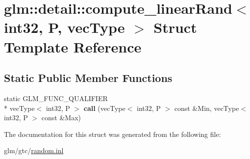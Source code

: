\hypertarget{structglm_1_1detail_1_1compute__linearRand_3_01int32_00_01P_00_01vecType_01_4}{\section{glm\-:\-:detail\-:\-:compute\-\_\-linear\-Rand$<$ int32, P, vec\-Type $>$ Struct Template Reference}
\label{structglm_1_1detail_1_1compute__linearRand_3_01int32_00_01P_00_01vecType_01_4}
}
\subsection*{Static Public Member Functions}
\begin{DoxyCompactItemize}
\item 
\hypertarget{structglm_1_1detail_1_1compute__linearRand_3_01int32_00_01P_00_01vecType_01_4_ac09eec8e177afcecc1e0d52d6d9951b3}{static G\-L\-M\-\_\-\-F\-U\-N\-C\-\_\-\-Q\-U\-A\-L\-I\-F\-I\-E\-R \\*
vec\-Type$<$ int32, P $>$ {\bfseries call} (vec\-Type$<$ int32, P $>$ const \&Min, vec\-Type$<$ int32, P $>$ const \&Max)}\label{structglm_1_1detail_1_1compute__linearRand_3_01int32_00_01P_00_01vecType_01_4_ac09eec8e177afcecc1e0d52d6d9951b3}

\end{DoxyCompactItemize}


The documentation for this struct was generated from the following file\-:\begin{DoxyCompactItemize}
\item 
glm/gtc/\hyperlink{random_8inl}{random.\-inl}\end{DoxyCompactItemize}
